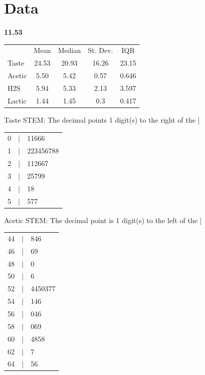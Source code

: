 \documentclass[12pt]{article}
\renewcommand\part[1]{\vspace{.10in}\textbf{#1}\par}
\begin{document}
\section{Data}
\part{11.53}
	\begin{center}
	\begin{tabular}{lcccc}
		& Mean & Median & St. Dev. & IQR\\
		Taste & 24.53 & 20.93 & 16.26 & 23.15\\
		Acetic & 5.50 & 5.42 & 0.57 & 0.646\\
		H2S & 5.94 & 5.33 & 2.13 & 3.597\\
		Lactic & 1.44 & 1.45 & 0.3 & 0.417\\
	\end{tabular}
	\end{center}\par
	\newpage
	Taste STEM: The decimal points 1 digit(s) to the right of the |\par
	\begin{tabular}{lcl}
		0 & | & 11666\\
		1 & | & 223456788\\
		2 & | & 112667\\
		3 & | & 25799\\
		4 & | & 18\\
		5 & | & 577\\
	\end{tabular}\par
	
	Acetic STEM: The decimal point is 1 digit(s) to the left of the |\par
	\begin{tabular}{lcl}
		44 & | & 846\\
		46 & | & 69\\
		48 & | & 0\\
		50 & | & 6\\
		52 & | & 4450377\\
		54 & | & 146\\
		56 & | & 046\\
		58 & | & 069\\
		60 & | & 4858\\
		62 & | & 7\\
		64 & | & 56\\
	\end{tabular}\par
	
\end{document}
